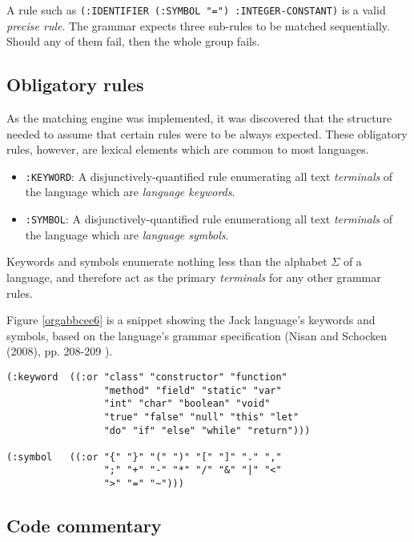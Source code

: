 \documentclass[a4paper,11pt,oneside]{article}
\begin{document}
A rule such as \texttt{(:IDENTIFIER (:SYMBOL "=") :INTEGER-CONSTANT)} is a
valid \emph{precise rule}. The grammar expects three sub-rules to be matched
sequentially. Should any of them fail, then the whole group fails.

\subsection*{Obligatory rules}
\label{sec:orgf98d3ec}

As the matching engine was implemented, it was discovered that the
structure needed to assume that certain rules were to be
always expected. These obligatory rules, however, are lexical elements
which are common to most languages.

\begin{itemize}
\item \texttt{:KEYWORD}: A disjunctively-quantified rule enumerating all text
\emph{terminals} of the language which are \emph{language keywords}.
\item \texttt{:SYMBOL}: A disjunctively-quantified rule enumerationg all text
\emph{terminals} of the language which are \emph{language symbols}.
\end{itemize}

Keywords and symbols enumerate nothing less than the alphabet \(\Sigma\)
of a language, and therefore act as the primary \emph{terminals} for any
other grammar rules.

Figure \ref{orgabbcee6} is a snippet showing the Jack language's
keywords and symbols, based on the language's grammar specification
(Nisan and Schocken (2008), pp. 208-209 \cite{nand2tetris}).

\begin{verbatim}
(:keyword  ((:or "class" "constructor" "function"
                 "method" "field" "static" "var"
                 "int" "char" "boolean" "void"
                 "true" "false" "null" "this" "let"
                 "do" "if" "else" "while" "return")))

(:symbol   ((:or "{" "}" "(" ")" "[" "]" "." ","
                 ";" "+" "-" "*" "/" "&" "|" "<"
                 ">" "=" "~")))
\end{verbatim}

\subsection*{Code commentary}
\label{sec:orgd4c4a90}
\end{document}
